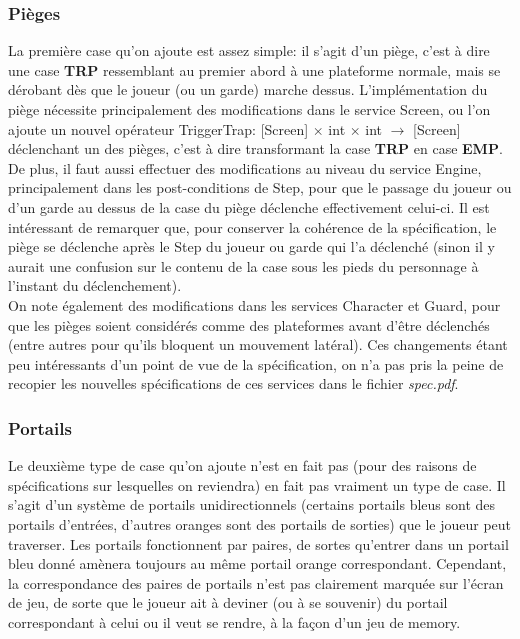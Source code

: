 \documentclass{article}
\begin{document}
\subsubsection{Pièges}
La première case qu'on ajoute est assez simple: il s'agit d'un piège, c'est à dire une case \textbf{TRP} ressemblant au premier abord à une plateforme normale, mais se dérobant dès que le joueur (ou un garde) marche dessus.
L'implémentation du piège nécessite principalement des modifications dans le service \textrm{Screen}, ou l'on ajoute un nouvel opérateur \textrm{TriggerTrap: [Screen] $\times$ int $\times$ int $\rightarrow$ [Screen]} déclenchant un des pièges, c'est à dire transformant la case \textbf{TRP} en case \textbf{EMP}. De plus, il faut aussi effectuer des modifications au niveau du service \textrm{Engine}, principalement dans les post-conditions de \textrm{Step}, pour que le passage du joueur ou d'un garde au dessus de la case du piège déclenche effectivement celui-ci. Il est intéressant de remarquer que, pour conserver la cohérence de la spécification, le piège se déclenche après le \textrm{Step} du joueur ou garde qui l'a déclenché (sinon il y aurait une confusion sur le contenu de la case sous les pieds du personnage à l'instant du déclenchement).\\

On note également des modifications dans les services \textrm{Character} et \textrm{Guard}, pour que les pièges soient considérés comme des plateformes avant d'être déclenchés (entre autres pour qu'ils bloquent un mouvement latéral). Ces changements étant peu intéressants d'un point de vue de la spécification, on n'a pas pris la peine de recopier les nouvelles spécifications de ces services dans le fichier \textit{spec.pdf}.

\subsubsection{Portails}
Le deuxième type de case qu'on ajoute n'est en fait pas (pour des raisons de spécifications sur lesquelles on reviendra) en fait pas vraiment un type de case. Il s'agit d'un système de portails unidirectionnels (certains portails bleus sont des portails d'entrées, d'autres oranges sont des portails de sorties) que le joueur peut traverser. Les portails fonctionnent par paires, de sortes qu'entrer dans un portail bleu donné amènera toujours au même portail orange correspondant. Cependant, la correspondance des paires de portails n'est pas clairement marquée sur l'écran de jeu, de sorte que le joueur ait à deviner (ou à se souvenir) du portail correspondant à celui ou il veut se rendre, à la façon d'un jeu de memory.\\
\end{document}
